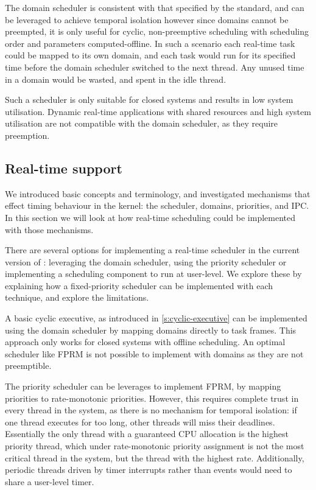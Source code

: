 The domain scheduler is consistent with that specified by the \citet{ARINC653} standard, and 
can be leveraged to achieve temporal isolation however since domains cannot be
preempted, it is only useful for cyclic, non-preemptive scheduling with scheduling order and
parameters computed-offline.
In such a scenario each real-time task could be mapped to its own domain, and each task would run for its specified time before the domain scheduler switched to the next thread.
Any unused time in a domain would be wasted, and spent in the idle thread.

Such a scheduler is only suitable for closed systems and results in low system utilisation.
Dynamic real-time applications with shared resources and high system utilisation are not compatible
with the domain scheduler, as they require preemption.

\subsection{Real-time support}

We introduced basic \selfour concepts and terminology, and investigated mechanisms that effect
timing behaviour in the kernel: the scheduler, domains, priorities,  and IPC. 
In this section we will look at how real-time scheduling could be implemented with those mechanisms.

There are several options for implementing a real-time scheduler in the current version of \selfour:
leveraging the domain scheduler, using the priority scheduler or implementing a scheduling component
to run at user-level. We explore these by explaining how a fixed-priority scheduler can be
implemented with each technique, and explore the limitations. 

A basic cyclic executive, as introduced in \cref{s:cyclic-executive} can be implemented using the
domain scheduler by mapping domains directly to task frames. This approach only works for closed
systems with offline scheduling. An optimal scheduler like \gls{FPRM} is not possible to implement
with domains as they are not preemptible. 

The priority scheduler can be leverages to implement \gls{FPRM}, by mapping \selfour priorities to 
rate-monotonic priorities. 
However, this requires complete trust in every thread in the system, as there is no mechanism for
temporal isolation: if one thread executes for too long, other threads will miss their deadlines.
Essentially the only thread with a guaranteed CPU allocation is the highest priority thread, which
under rate-monotonic priority assignment is not the most critical thread in the system, but the
thread with the highest rate.  Additionally, periodic threads driven by timer interrupts rather than
events would need to share a user-level timer.

